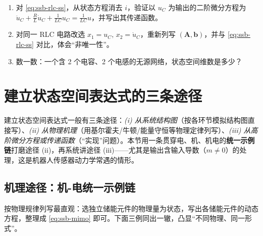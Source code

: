 \begin{practice}
\begin{enumerate}
  \item 对 \cref{eq:ssb-rlc-ss}，从状态方程消去 $i$，验证以 $u_C$ 为输出的二阶微分方程为 $\ddot u_C+\tfrac{R}{L}\dot u_C+\tfrac{1}{LC}u_C=\tfrac{1}{LC}u$，并写出其传递函数。
  \item 对同一 RLC 电路改选 $x_1=u_C,\,x_2=\dot u_C$，重新列写 $(\mathbf{A},\mathbf{b})$，并与 \cref{eq:ssb-rlc-ss} 对比，体会“非唯一性”。
  \item 数一数：一个含 2 个电容、2 个电感的无源网络，状态空间维数是多少？
\end{enumerate}
\end{practice}

\section{建立状态空间表达式的三条途径}
\label{sec:ssb-build}

建立状态空间表达式一般有三条途径\cite{liubao2006modern}：\emph{(i) 从系统结构图}（按各环节模拟结构图直接写）、\emph{(ii) 从物理机理}（用基尔霍夫/牛顿/能量守恒等物理定律列写）、\emph{(iii) 从高阶微分方程或传递函数}（“实现”问题）。本节用一条贯穿电、机、机电的\textbf{统一示例链}打磨途径 (ii)，再系统讲途径 (iii)——尤其是输出含输入导数（$m\neq0$）的处理，这是机器人传感器动力学常遇的情形。

\subsection{机理途径：机-电统一示例链}
\label{sec:ssb-mechanism}

按物理规律列写最直观：选独立储能元件的物理量为状态，写出各储能元件的动态方程，整理成 \cref{eq:ssb-mimo} 即可。下面三例同出一辙，凸显“不同物理、同一形式”。

